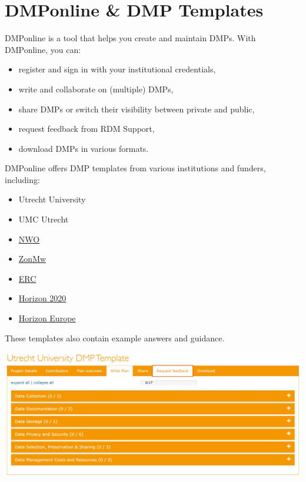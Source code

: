 \documentclass[
  letterpaper,
  DIV=11,
  numbers=noendperiod]{scrreprt}
\providecommand{\tightlist}{%
  \setlength{\itemsep}{0pt}\setlength{\parskip}{0pt}}\usepackage{longtable,booktabs,array}
\begin{document}
\hypertarget{dmponline-dmp-templates}{%
\section*{DMPonline \& DMP Templates}\label{dmponline-dmp-templates}}


DMPonline is a tool that helps you create and maintain DMPs. With
DMPonline, you can:

\begin{itemize}
\tightlist
\item
  register and sign in with your institutional credentials,
\item
  write and collaborate on (multiple) DMPs,
\item
  share DMPs or switch their visibility between private and public,
\item
  request feedback from RDM Support,
\item
  download DMPs in various formats.
\end{itemize}

DMPonline offers DMP templates from various institutions and funders,
including:

\begin{itemize}
\tightlist
\item
  Utrecht University
\item
  UMC Utrecht
\item
  \href{https://dmponline.dcc.ac.uk/template_export/1753695087.pdf}{NWO}
\item
  \href{https://dmponline.dcc.ac.uk/template_export/1461074155.pdf}{ZonMw}
\item
  \href{https://dmponline.dcc.ac.uk/template_export/2088403152.pdf}{ERC}
\item
  \href{https://dmponline.dcc.ac.uk/template_export/1612436782.pdf}{Horizon
  2020}
\item
  \href{https://dmponline.dcc.ac.uk/template_export/5992485.pdf}{Horizon
  Europe}
\end{itemize}

These templates also contain example answers and guidance.

\includegraphics{images/uu-dmp-template.JPG}
\end{document}
